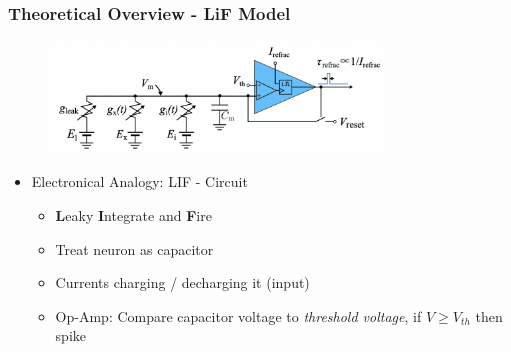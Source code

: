 \documentclass{beamer}
\begin{document}
\begin{frame}

    \frametitle{Theoretical Overview - LiF Model}

     \begin{figure}
    		\centering
    		\includegraphics[width=0.8\textwidth]{figures/lif_script.png}
    \end{figure}

     \begin{itemize}

   		\item Electronical Analogy: LIF - Circuit
   		\begin{itemize}
   				\item \textbf{L}eaky \textbf{I}ntegrate and \textbf{F}ire
   				\item Treat neuron as capacitor
   				\item Currents charging / decharging it (input)
   				\item Op-Amp: Compare capacitor voltage to \textit{threshold voltage},  if
   				$V\geq V_{th}$ then spike
   		\end{itemize}
 	\end{itemize}

\end{frame}
\end{document}
